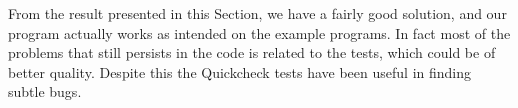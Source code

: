 
From the result presented in this Section, we have a fairly good solution, and our program actually works as intended on the example programs.
In fact most of the problems that still persists in the code is related to the tests, which could be of better quality. Despite this the Quickcheck tests have been useful in finding subtle bugs.


